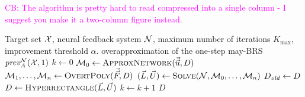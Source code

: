 \documentclass[letterpaper, 10 pt, conference]{ieeeconf}  %
\newcommand{\cb}[1]{\noindent\textcolor{magenta}{\newline CB: #1}}
\newcommand{\cb}[1]{}
\begin{document}
\cb{The algorithm is pretty hard to read compressed into a single column - I suggest you make it a two-column figure instead.}
\begin{algorithm*}
\caption{Domain Refinement with Polyhedral Enclosures (DRiPy)}
\label{alg:drip}
\begin{algorithmic}[1]
\Require Target set $\mathcal{X}$, 
         neural feedback system $\mathcal{N}$,
         maximum number of iterations $K_{\max}$,
         improvement threshold $\alpha$.
\Ensure overapproximation of the one-step may-BRS $\mathit{prev}_A^{\mathcal{N}}(\mathcal{X}, 1)$
\State $k \gets 0$ 
\Repeat
    \State $\mathcal{M}_0 \gets \textsc{ApproxNetwork}(\vec{\vec{u}},D)$  
    \State $\mathcal{M}_1,\dots,\mathcal{M}_n \gets
    \textsc{OvertPoly}(\vec{\vec{F}}, D)$ 
    \State $(\vec{L}, \vec{U}) \gets
    \textsc{Solve}(\mathcal{N},\mathcal{M}_0,\dots,\mathcal{M}_n)$ 
    \State $D_{\mathit{old}} \gets D$ 
    \State $D \gets \textsc{Hyperrectangle}(\vec{L}, \vec{U})$ 
    \State $k \gets k + 1$ 
\State \Return $D$
\end{algorithmic}
\end{algorithm*}
\end{document}

